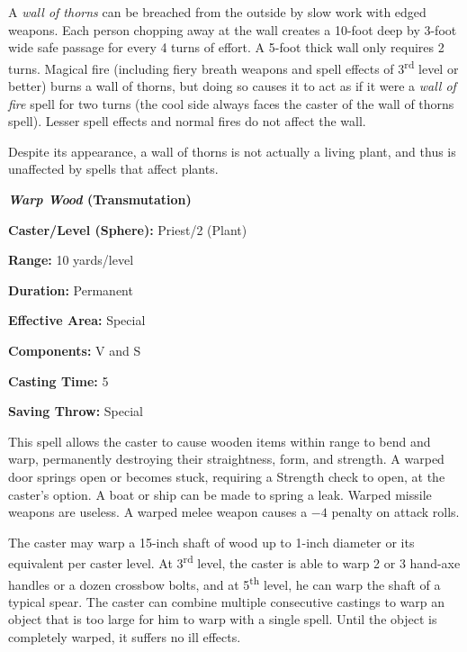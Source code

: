 \begin{multicols}{2}
A \textit{wall of thorns} can be breached from the outside by slow work with edged weapons.  Each person chopping away at the wall creates a 10-foot deep by 3-foot wide safe passage for every 4 turns of effort.  A 5-foot thick wall only requires 2 turns.  Magical fire (including fiery breath weapons and spell effects of 3\textsuperscript{rd} level or better) burns a wall of thorns, but doing so causes it to act as if it were a \textit{wall of fire} spell for two turns (the cool side always faces the caster of the wall of thorns spell).  Lesser spell effects and normal fires do not affect the wall.  

Despite its appearance, a wall of thorns is not actually a living plant, and thus is unaffected by spells that affect plants.

\vspace{1em}

\noindent
\begin{minipage}{\columnwidth}

\noindent \textbf{\textit{Warp Wood} (Transmutation)}

\noindent \textbf{Caster/Level (Sphere):} Priest/2 (Plant)

\noindent \textbf{Range:} 10 yards/level

\noindent \textbf{Duration:} Permanent

\noindent \textbf{Effective Area:} Special

\noindent \textbf{Components:} V and S

\noindent \textbf{Casting Time:} 5

\noindent \textbf{Saving Throw:} Special

\end{minipage}

This spell allows the caster to cause wooden items within range to bend and warp, permanently destroying their straightness, form, and strength.  A warped door springs open or becomes stuck, requiring a Strength check to open, at the caster's option.  A boat or ship can be made to spring a leak.  Warped missile weapons are useless.  A warped melee weapon causes a $-4$ penalty on attack rolls. 

The caster may warp a 15-inch shaft of wood up to 1-inch diameter or its equivalent per caster level.  At 3\textsuperscript{rd} level, the caster is able to warp 2 or 3 hand-axe handles or a dozen crossbow bolts, and at 5\textsuperscript{th} level, he can warp the shaft of a typical spear.  The caster can combine multiple consecutive castings to warp an object that is too large for him to warp with a single spell.  Until the object is completely warped, it suffers no ill effects.


\end{multicols}
